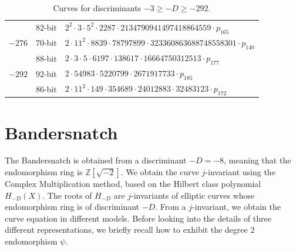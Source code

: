 \documentclass[version=preprint]{iacrcc}
\newcommand{\Z}{\ensuremath{\mathbb Z}}
\begin{document}
\begin{table}[!ht]
\begin{tabularx}{\textwidth}{ccl}
 & $82$-bit & $2^{2}  \cdot 3  \cdot 5^{2}  \cdot 2287  \cdot 2134790941497418864559  \cdot p_{165}$\\
$-276$ & $70$-bit & $2  \cdot 11^{2}  \cdot 8839  \cdot 78797899  \cdot 323360863688748558301  \cdot p_{140}$\\
 & $88$-bit & $2  \cdot 3  \cdot 5  \cdot 6197  \cdot 138617  \cdot 16664750312513  \cdot p_{177}$\\
$-292$ & $92$-bit & $2  \cdot 54983  \cdot 5220799  \cdot 2671917733  \cdot p_{185}$\\
 & $86$-bit & $2  \cdot 11^{2}  \cdot 149  \cdot 354689  \cdot
24012883  \cdot 32483123  \cdot p_{172}$\\
    \end{tabularx}
    \caption{Curves for discriminants $-3 \geq -D \geq -292$.}
    \label{tab:group-order-factorization}
\end{table}

\section{Bandersnatch}\label{sec:bandersnatch}

The Bandersnatch is obtained from a discriminant $-D = -8$, meaning
that the endomorphism ring is $\Z[\sqrt{-2}]$.
We obtain the curve $j$-invariant using the Complex Multiplication
method, based on the Hilbert class polynomial $H_{-D}(X)$.
The roots of $H_{-D}$ are $j$-invariants of elliptic curves whose
endomorphism ring is of discriminant $-D$.
From a $j$-invariant, we obtain the curve equation in different
models. Before looking into the details of three different representations,
we briefly recall how to exhibit the degree $2$ endomorphism $\psi$.
\end{document}
